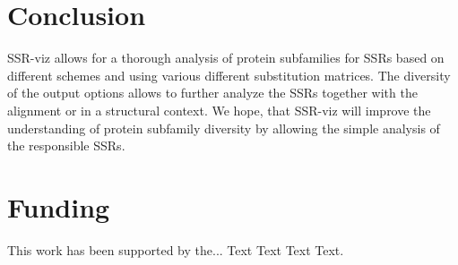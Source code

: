 \documentclass{bioinfo}
\begin{document}
\section{Conclusion}
%
SSR-viz allows for a thorough analysis of protein subfamilies for SSRs based on different schemes and using 
various different substitution matrices. %
The diversity of the output options allows to further analyze the SSRs together with the alignment or in a structural context. 
We hope, that SSR-viz will improve the understanding of protein subfamily diversity by allowing the 
simple analysis of the responsible SSRs.
%
\section*{Funding}

This work has been supported by the... Text Text  Text Text.\vspace*{-12pt}

%
%
%
%
%
%
%
%
%


\begin{thebibliography}{}
% 
% 
% 
% 
% 
% 
% 

\end{thebibliography}
\end{document}
